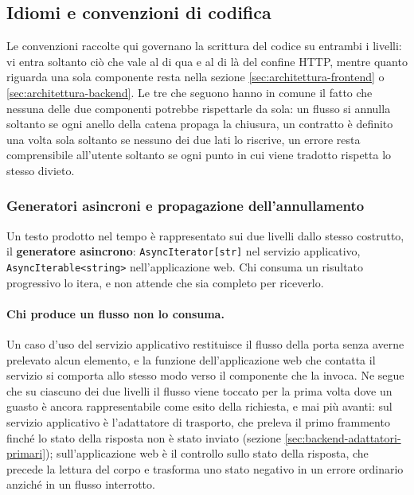 \documentclass[a4paper, 10pt]{article}
\begin{document}
\subsection{Idiomi e convenzioni di codifica}
\label{sec:idiomi-convenzioni}
Le convenzioni raccolte qui governano la scrittura del codice su entrambi i livelli: vi entra soltanto ciò che vale al di qua e al di là del confine HTTP, mentre quanto riguarda una sola componente resta nella sezione \ref{sec:architettura-frontend} o \ref{sec:architettura-backend}. Le tre che seguono hanno in comune il fatto che nessuna delle due componenti potrebbe rispettarle da sola: un flusso si annulla soltanto se ogni anello della catena propaga la chiusura, un contratto è definito una volta sola soltanto se nessuno dei due lati lo riscrive, un errore resta comprensibile all'utente soltanto se ogni punto in cui viene tradotto rispetta lo stesso divieto.

\subsubsection{Generatori asincroni e propagazione dell'annullamento}
\label{sec:idiomi-generatori}
Un testo prodotto nel tempo è rappresentato sui due livelli dallo stesso costrutto, il \textbf{generatore asincrono}: \texttt{AsyncIterator[str]} nel servizio applicativo, \texttt{AsyncIterable<string>} nell'applicazione web. Chi consuma un risultato progressivo lo itera, e non attende che sia completo per riceverlo.

\paragraph{Chi produce un flusso non lo consuma.}
Un caso d'uso del servizio applicativo restituisce il flusso della porta senza averne prelevato alcun elemento, e la funzione dell'applicazione web che contatta il servizio si comporta allo stesso modo verso il componente che la invoca. Ne segue che su ciascuno dei due livelli il flusso viene toccato per la prima volta dove un guasto è ancora rappresentabile come esito della richiesta, e mai più avanti: sul servizio applicativo è l'adattatore di trasporto, che preleva il primo frammento finché lo stato della risposta non è stato inviato (sezione \ref{sec:backend-adattatori-primari}); sull'applicazione web è il controllo sullo stato della risposta, che precede la lettura del corpo e trasforma uno stato negativo in un errore ordinario anziché in un flusso interrotto.
\end{document}

